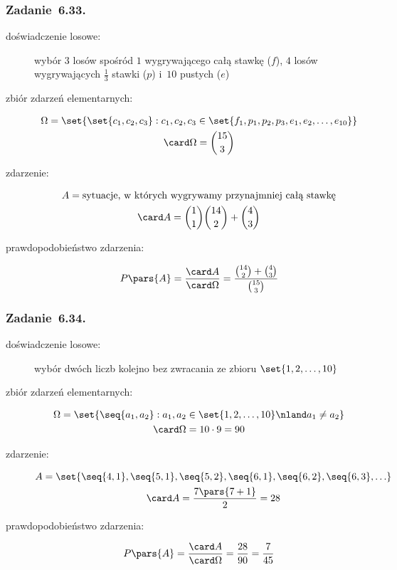 \subsubsection*{Zadanie~6.33.}
\begin{description}
    \item[doświadczenie losowe:] wybór \(3\) losów spośród \(1\) wygrywającego całą stawkę (\(f\)), \(4\) losów wygrywających \(\frac{1}{3}\) stawki (\(p\)) i~\(10\) pustych (\(e\))
    \item[zbiór zdarzeń elementarnych:]
        \begin{gather*}
            \Omega = \set{\set{c_1, c_2, c_3} : c_1, c_2, c_3 \in \set{f_1, p_1, p_2, p_3, e_1, e_2, \ldots, e_{10}}}\\
            \card\Omega = \binom{15}{3}
        \end{gather*}
    \item[zdarzenie:]
        \begin{gather*}
            A = \text{sytuacje, w~których wygrywamy przynajmniej całą stawkę}\\
            \card A = \binom{1}{1}\binom{14}{2} + \binom{4}{3}
        \end{gather*}
    \item[prawdopodobieństwo zdarzenia:]
        \begin{equation*}
            P\pars{A}
                = \frac{\card A}{\card\Omega}
                = \frac{\binom{14}{2} + \binom{4}{3}}{\binom{15}{3}}
        \end{equation*}
\end{description}
\subsubsection*{Zadanie~6.34.}
\begin{description}
    \item[doświadczenie losowe:] wybór dwóch liczb kolejno bez zwracania ze zbioru \(\set{1, 2, \ldots, 10}\)
    \item[zbiór zdarzeń elementarnych:]
        \begin{gather*}
            \Omega = \set{\seq{a_1, a_2} : a_1, a_2 \in \set{1, 2, \ldots, 10} \nland a_1 \neq a_2}\\
            \card\Omega = 10 \cdot 9 = 90
        \end{gather*}
    \item[zdarzenie:]
        \begin{gather*}
            A = \set{\seq{4, 1}, \seq{5, 1}, \seq{5, 2}, \seq{6, 1}, \seq{6, 2}, \seq{6, 3}, \ldots}\\
            \card A = \frac{7\pars{7 + 1}}{2} = 28
        \end{gather*}
    \item[prawdopodobieństwo zdarzenia:]
        \begin{equation*}
            P\pars{A}
                = \frac{\card A}{\card\Omega}
                = \frac{28}{90}
                = \frac{7}{45}
        \end{equation*}
\end{description}
